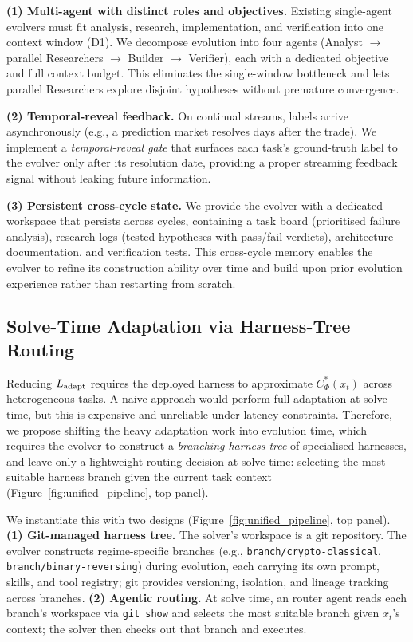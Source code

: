 \noindent\textbf{(1) Multi-agent with distinct roles and objectives.}
Existing single-agent evolvers must fit analysis, research, implementation, and verification into one context window (D1). We decompose evolution into four agents (Analyst $\to$ parallel Researchers $\to$ Builder $\to$ Verifier), each with a dedicated objective and full context budget. This eliminates the single-window bottleneck and lets parallel Researchers explore disjoint hypotheses without premature convergence.

\noindent\textbf{(2) Temporal-reveal feedback.}
On continual streams, labels arrive asynchronously (e.g., a prediction market resolves days after the trade). We implement a \emph{temporal-reveal gate} that surfaces each task's ground-truth label to the evolver only after its resolution date, providing a proper streaming feedback signal without leaking future information.

\noindent\textbf{(3) Persistent cross-cycle state.}
We provide the evolver with a dedicated workspace that persists across cycles, containing a task board (prioritised failure analysis), research logs (tested hypotheses with pass/fail verdicts), architecture documentation, and verification tests. This cross-cycle memory enables the evolver to refine its construction ability over time and build upon prior evolution experience rather than restarting from scratch.




\subsection{Solve-Time Adaptation via Harness-Tree Routing}
\label{sec:method-nav}

Reducing $L_{\text{adapt}}$ requires the deployed harness to approximate $C^*_\Phi(x_t)$ across heterogeneous tasks. A naive approach would perform full adaptation at solve time, but this is expensive and unreliable under latency constraints. Therefore, we propose shifting the heavy adaptation work into evolution time, which requires the evolver to construct a \emph{branching harness tree} of specialised harnesses, and leave only a lightweight routing decision at solve time: selecting the most suitable harness branch given the current task context (Figure~\ref{fig:unified_pipeline}, top panel).

We instantiate this with two designs (Figure~\ref{fig:unified_pipeline}, top panel). \textbf{(1) Git-managed harness tree.} The solver's workspace is a git repository. The evolver constructs regime-specific branches (e.g., \texttt{branch/crypto-classical}, \texttt{branch/binary-reversing}) during evolution, each carrying its own prompt, skills, and tool registry; git provides versioning, isolation, and lineage tracking across branches. \textbf{(2) Agentic routing.} At solve time, an router agent reads each branch's workspace via \texttt{git show} and selects the most suitable branch given $x_t$'s context; the solver then checks out that branch and executes.

